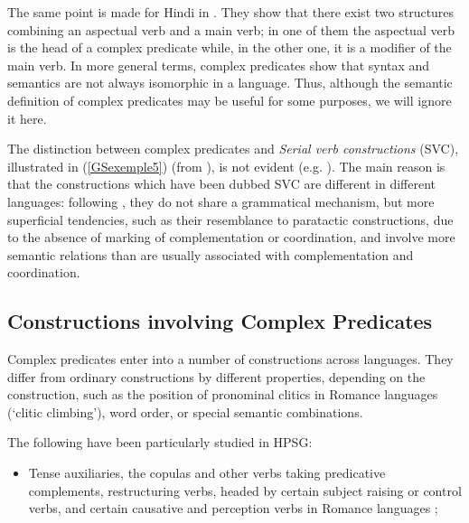 \documentclass[output=paper]{langsci/langscibook}
\begin{document}
{\begin{exe}
\begin{xlist}
	\end{xlist}
\end{exe}

The same point is made for Hindi in \cite{poornima2009hindi}. They show that there exist two structures combining an aspectual verb and a main verb; in one of them the aspectual verb is the head of a complex predicate while, in the other one, it is a modifier of the main verb. In more general terms, complex predicates show that syntax and semantics are not always isomorphic in a language. Thus, although the semantic definition of complex predicates may be useful for some purposes, we will ignore it here.

The distinction between complex predicates and \textit{Serial verb constructions} (SVC), illustrated in (\ref{GSexemple5}) (from \citealt{MH2016}), is not evident (e.g. \citealt{andrews1999complex, MH2016}). The main reason is that the constructions which have been dubbed SVC are different in different languages: following \cite{andrews1999complex}, they do not share a grammatical mechanism, but more superficial tendencies, such as their resemblance to paratactic constructions, due to the absence of marking of complementation or coordination, and involve more semantic relations than are usually associated with complementation and coordination.

\begin{exe}
	\label{GSexemple5} 
\end{exe}

\subsection{Constructions involving Complex Predicates}\label{GSsection1.2}

Complex predicates enter into a number of constructions across languages. They differ from ordinary constructions by different properties, depending on the construction, such as the position of pronominal clitics in Romance languages (`clitic climbing'), word order, or special semantic combinations. 

The following have been particularly studied in HPSG:

\begin{itemize}
	
	\item Tense auxiliaries, the copulas and other verbs taking predicative complements, restructuring verbs, headed by certain subject raising or control verbs, and certain causative and perception verbs in Romance languages \citep{abeille1994complementation, abeille2000french, abeille2001deux, abeille2001varieties, AG2002b-u, AG2010, abeille1995doublestructure, abeille1998romance, AGS1998, Monachesi98a};
	

\end{itemize}}
\end{document}
